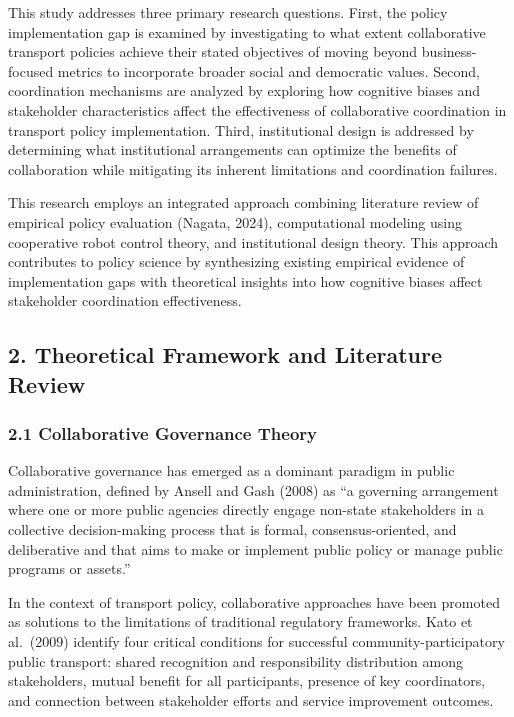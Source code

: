 This study addresses three primary research questions. First, the policy implementation gap is examined by investigating to what extent collaborative transport policies achieve their stated objectives of moving beyond business-focused metrics to incorporate broader social and democratic values. Second, coordination mechanisms are analyzed by exploring how cognitive biases and stakeholder characteristics affect the effectiveness of collaborative coordination in transport policy implementation. Third, institutional design is addressed by determining what institutional arrangements can optimize the benefits of collaboration while mitigating its inherent limitations and coordination failures.

This research employs an integrated approach combining literature review of empirical policy evaluation (Nagata, 2024), computational modeling using cooperative robot control theory, and institutional design theory. This approach contributes to policy science by synthesizing existing empirical evidence of implementation gaps with theoretical insights into how cognitive biases affect stakeholder coordination effectiveness.

\subsection{2. Theoretical Framework and Literature Review}\label{theoretical-framework-and-literature-review}

\subsubsection{2.1 Collaborative Governance Theory}\label{collaborative-governance-theory}

Collaborative governance has emerged as a dominant paradigm in public administration, defined by Ansell and Gash (2008) as ``a governing arrangement where one or more public agencies directly engage non-state stakeholders in a collective decision-making process that is formal, consensus-oriented, and deliberative and that aims to make or implement public policy or manage public programs or assets.''

In the context of transport policy, collaborative approaches have been promoted as solutions to the limitations of traditional regulatory frameworks. Kato et al.~(2009) identify four critical conditions for successful community-participatory public transport: shared recognition and responsibility distribution among stakeholders, mutual benefit for all participants, presence of key coordinators, and connection between stakeholder efforts and service improvement outcomes.

